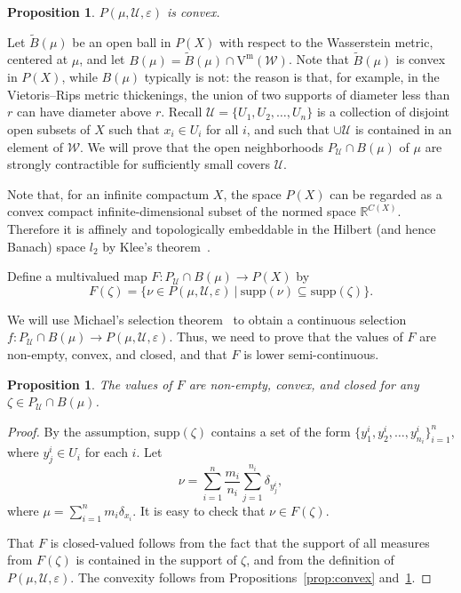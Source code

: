\documentclass[11pt, reqno, english]{amsart}
\theoremstyle{plain}
\newtheorem{proposition}[lemma]{Proposition}
\theoremstyle{definition}
\theoremstyle{myremark}
\newcommand{\cU}{\mathcal{U}}
\newcommand{\cW}{\mathcal{W}}
\newcommand{\supp}{\mathrm{supp}}
\newcommand{\vietm}[1]{\mathrm{V}^\mathrm{m}(#1)}
\begin{document}
\begin{proposition}
\label{prop:convex2}
$P(\mu,\cU,\varepsilon)$ is convex.
\end{proposition}

Let $\tilde{B}(\mu)$ be an open ball in $P(X)$ with respect to the Wasserstein metric, centered at $\mu$, and let $B(\mu) = \tilde{B}(\mu)\cap \vietm{\cW}$.
Note that $\tilde{B}(\mu)$ is convex in $P(X)$, while $B(\mu)$ typically is not: the reason is that, for example, in the Vietoris--Rips metric thickenings, the union of two supports of diameter less than $r$ can have diameter above $r$.
Recall $\cU=\{U_1, U_2, \dots, U_n\}$ is a collection of disjoint open subsets of $X$ such that $x_i\in U_i$ for all $i$, and such that $\cup\cU$ is contained in an element of $\cW$.
We will prove that the open neighborhoods $P_{\cU}\cap B(\mu)$ of $\mu$ are strongly contractible for sufficiently small covers $\cU$.

Note that, for an infinite compactum $X$, the space $P(X)$  can be regarded as a convex compact infinite-dimensional subset of the normed space $\mathbb R^{C(X)}$.
Therefore it is affinely and topologically embeddable in the Hilbert (and hence Banach) space $l_2$ by Klee's theorem~\cite[Theorem~1.1]{klee1955some}.


Define a multivalued map $F\colon P_{\cU}\cap B(\mu) \to P(X)$ by
\begin{equation}
\label{eq:F}
F(\zeta)=\{\nu\in P(\mu,\cU,\varepsilon)~|~\supp(\nu)\subseteq\supp(\zeta)\}.
\end{equation}
 
We will use Michael's selection theorem~\cite{michael1956continuous} to obtain a continuous selection $f\colon P_{\cU}\cap B(\mu) \to P(\mu,\cU,\varepsilon)$.
Thus, we  need to prove that 
the values of $F$ are non-empty, convex, and closed, and that $F$ is lower semi-continuous.

\begin{proposition}
\label{prop:nonempty}
The values of $F$ are non-empty, convex, and closed for any $\zeta\in P_{\cU}\cap B(\mu)$.
\end{proposition}

\begin{proof}
By the assumption, $\supp(\zeta)$  contains a set of the form 
$\{ y^i_1,y^i_2,\dots, y^i_{n_i}\}_{i=1}^n$, where $y^i_j\in U_i$ for each $i$.
Let 
\[\nu =\sum_{i=1}^n \frac{m_i}{n_i} \sum_{j=1}^{n_i} \delta_{y^i_j},\]
where $\mu =\sum_{i=1}^n m_i \delta_{x_i}$.
It is easy to check that $\nu\in F(\zeta)$.

That $F$ is closed-valued follows from the fact that the support of all measures from $F(\zeta)$ is contained in the support of $\zeta$, and from the definition of $P(\mu,\cU,\varepsilon)$.
The convexity follows from Propositions~\ref{prop:convex} and~\ref{prop:convex2}.
\end{proof}
\end{document}
